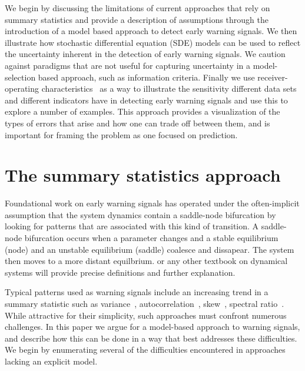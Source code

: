 \documentclass[authoryear,review,11pt]{elsarticle}
\begin{document}
We begin by discussing the limitations of current approaches that rely on summary statistics
and provide a description of assumptions through the introduction of a model based approach to detect early warning signals.
We then illustrate how stochastic differential equation (SDE) models can be used
to reflect the uncertainty inherent in the detection of early warning signals. 
We caution against paradigms that are not useful for capturing uncertainty in
a model-selection based approach, such as information criteria.
Finally we use receiver-operating characteristics~\citep{Green1989, Keller2009}
as a way to illustrate the sensitivity different data sets
and different indicators have in detecting early warning signals and use this to explore a number of examples.
This approach provides a visualization of the types of errors that arise and how one can trade off between them,
and is important for framing the problem as one focused on prediction.  


\section{The summary statistics approach}
Foundational work on early warning signals has operated under the often-implicit assumption
that the system dynamics contain a saddle-node bifurcation by
looking for patterns that are associated with this kind of transition.
A saddle-node bifurcation occurs when a parameter changes and a stable equilibrium 
(node) and an unstable equilibrium (saddle) coalesce and dissapear.  The system
then moves to a more distant equilbrium.  \citet{Guckenheimer1983} or any other 
textbook on dynamical systems will provide precise definitions and further explanation.   

Typical patterns used as warning signals include an increasing trend in a summary statistic such as
variance~\citep{Carpenter2006}, autocorrelation~\citep{Held2004, Dakos2008},
skew~\citep{Guttal2008}, spectral ratio~\citep{Biggs2009}.
While attractive for their simplicity, such approaches must confront numerous challenges.
In this paper we argue for a model-based approach to warning signals,
and describe how this can be done in a way that best addresses these difficulties.
We begin by enumerating several of the difficulties encountered in approaches lacking an explicit model.
\end{document}
